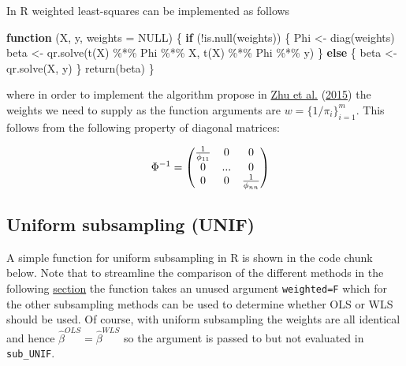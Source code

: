 \documentclass[
]{book}
\newenvironment{Shaded}{\begin{snugshade}}{\end{snugshade}}
\newcommand{\AttributeTok}[1]{\textcolor[rgb]{0.77,0.63,0.00}{#1}}
\newcommand{\ConstantTok}[1]{\textcolor[rgb]{0.00,0.00,0.00}{#1}}
\newcommand{\ControlFlowTok}[1]{\textcolor[rgb]{0.13,0.29,0.53}{\textbf{#1}}}
\newcommand{\FunctionTok}[1]{\textcolor[rgb]{0.00,0.00,0.00}{#1}}
\newcommand{\NormalTok}[1]{#1}
\newcommand{\OtherTok}[1]{\textcolor[rgb]{0.56,0.35,0.01}{#1}}
\newcommand{\SpecialCharTok}[1]{\textcolor[rgb]{0.00,0.00,0.00}{#1}}
\begin{document}
In R weighted least-squares can be implemented as follows

\begin{Shaded}
\begin{Highlighting}[]
\ControlFlowTok{function}\NormalTok{ (X, y, }\AttributeTok{weights =} \ConstantTok{NULL}\NormalTok{) }
\NormalTok{\{}
    \ControlFlowTok{if}\NormalTok{ (}\SpecialCharTok{!}\FunctionTok{is.null}\NormalTok{(weights)) \{}
\NormalTok{        Phi }\OtherTok{\textless{}{-}} \FunctionTok{diag}\NormalTok{(weights)}
\NormalTok{        beta }\OtherTok{\textless{}{-}} \FunctionTok{qr.solve}\NormalTok{(}\FunctionTok{t}\NormalTok{(X) }\SpecialCharTok{\%*\%}\NormalTok{ Phi }\SpecialCharTok{\%*\%}\NormalTok{ X, }\FunctionTok{t}\NormalTok{(X) }\SpecialCharTok{\%*\%}\NormalTok{ Phi }\SpecialCharTok{\%*\%}\NormalTok{ y)}
\NormalTok{    \}}
    \ControlFlowTok{else}\NormalTok{ \{}
\NormalTok{        beta }\OtherTok{\textless{}{-}} \FunctionTok{qr.solve}\NormalTok{(X, y)}
\NormalTok{    \}}
    \FunctionTok{return}\NormalTok{(beta)}
\NormalTok{\}}
\end{Highlighting}
\end{Shaded}

where in order to implement the algorithm propose in \protect\hyperlink{ref-zhu2015optimal}{Zhu et al.} (\protect\hyperlink{ref-zhu2015optimal}{2015}) the weights we need to supply as the function arguments are \(w=\{1/\pi_i\}^m_{i=1}\). This follows from the following property of diagonal matrices:

\[
\begin{aligned}
&& \Phi^{-1}&= \begin{pmatrix}
1\over\phi_{11} & 0 & 0 \\
0 & ... & 0 \\
0 & 0 & 1\over \phi_{nn}
\end{pmatrix}
 \\
\end{aligned}
\]

\hypertarget{uniform-subsampling-unif}{%
\subsection{Uniform subsampling (UNIF)}\label{uniform-subsampling-unif}}

A simple function for uniform subsampling in R is shown in the code chunk below. Note that to streamline the comparison of the different methods in the following \protect\hyperlink{lin-reg}{section} the function takes an unused argument \texttt{weighted=F} which for the other subsampling methods can be used to determine whether OLS or WLS should be used. Of course, with uniform subsampling the weights are all identical and hence \(\hat\beta^{OLS}=\hat\beta^{WLS}\) so the argument is passed to but not evaluated in \texttt{sub\_UNIF}.
\end{document}
